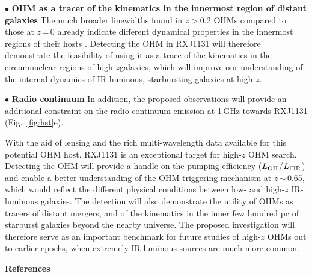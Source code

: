 \documentclass[letterpaper,11pt]{article}
\newcommand{\LFIR}{\mbox{$L_{\rm FIR}$}\xspace}
\newcommand{\LOH}{$L_{\rm OH}$\xspace}
\newcommand{\Fig}[1]{Fig.~\ref{fig:#1}}
\newcommand{\eq}{\,=\,}
\newcommand{\ssim}{\,$\sim$\,}
\newcommand{\highz}{high-$z$\space}
\newcommand{\obs}{observations\xspace}
\begin{document}
\noindent $\bullet$ {\bf OHM as a tracer of the kinematics in the innermost region of distant galaxies}
The much broader linewidths found in $z$$>$0.2 OHMs compared to those at $z$\eq0 already indicate
different dynamical properties in the innermost regions of their hosts \citep{Baan92a,Darling02a}.
Detecting the OHM in RXJ1131 will therefore demonstrate the feasibility of
using it as a trace of the kinematics in the circumnuclear regions of \highz galaxies, which will improve
our understanding of the internal dynamics of IR-luminous, starbursting galaxies at high $z$.

\noindent $\bullet$ {\bf Radio continuum}
In addition, the proposed \obs will provide an additional constraint on the radio continuum emission at 1\,GHz
towards RXJ1131 (\Fig{hst}e).

\noindent
With the aid of lensing and the rich multi-wavelength data available for this potential OHM host, RXJ1131 is an exceptional target
for high-$z$ OHM search.
Detecting the OHM will provide a handle on the pumping efficiency (\LOH/\LFIR)
and enable a better understanding of the OHM triggering mechanism at $z$\ssim0.65, which
would reflect the different physical conditions between low- and high-$z$ IR-luminous galaxies.
The detection will also demonstrate the utility of OHMs as tracers of distant mergers, and
of the kinematics in the inner few hundred pc
of starburst galaxies beyond the nearby universe. %
The proposed investigation will therefore serve as an
important benchmark for future studies of high-$z$ OHMs out to earlier epochs,
when extremely IR-luminous sources are much more common.



\noindent \textbf{References}
{\fontsize{10pt}{12pt}\selectfont
    
}
\end{document}
